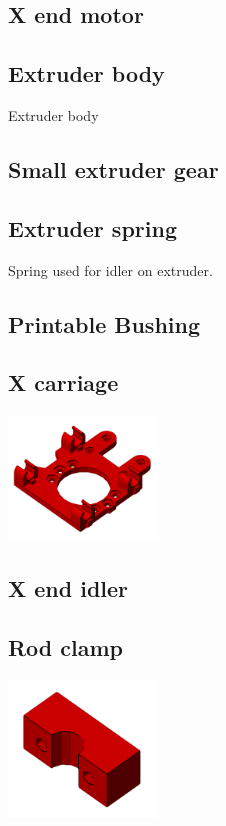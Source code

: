 \documentclass[11pt]{article}
\begin{document}
\hypertarget{thing_x-end-motor}{\subsection{X end motor}}

\hypertarget{thing_extruder-body}{\subsection{Extruder body}}
Extruder body

\hypertarget{thing_small-gear}{\subsection{Small extruder gear}}

\hypertarget{thing_extruder-spring}{\subsection{Extruder spring}}
Spring used for idler on extruder.

\hypertarget{thing_printable-bushing}{\subsection{Printable Bushing}}

\hypertarget{thing_x-carriage}{\subsection{X carriage}}
\includegraphics[width=4cm]{images/x-carriage.png}

\hypertarget{thing_x-end-idler}{\subsection{X end idler}}

\hypertarget{thing_rod-clamp}{\subsection{Rod clamp}}
\includegraphics[width=4cm]{images/rod-clamp.png}
\end{document}
